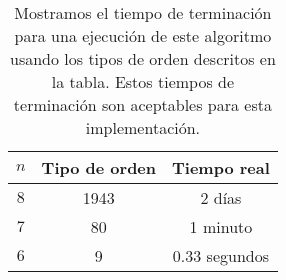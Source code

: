   \begin{table}
    \centering
    \begin{tabular}{|c|c|c|}
      \hline
      $n$ & Tipo de orden & Tiempo real      \\ \hline
      $8$ & 1943          & 2 días           \\ \hline
      $7$ & 80            & 1 minuto         \\ \hline
      $6$ & 9             & 0.33 segundos    \\ \hline
    \end{tabular}
    \caption{Mostramos el tiempo de terminación para una ejecución de este algoritmo usando los tipos de orden descritos en la tabla. Estos tiempos de terminación son aceptables para esta implementación.}
    \label{tabla_tiempo_exhaustive_at}
  \end{table}


